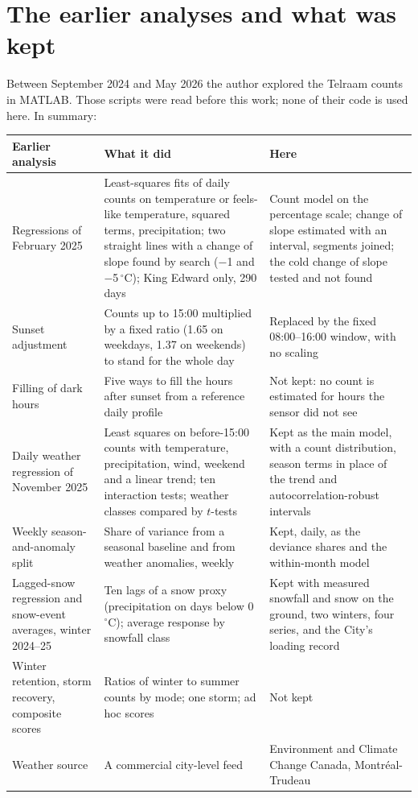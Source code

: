 \documentclass[11pt,a4paper]{article}
\begin{document}
\section{The earlier analyses and what was kept}\label{app:matlab}
Between September 2024 and May 2026 the author explored the Telraam counts in MATLAB. Those scripts were read before this work; none of their code is used here. In summary:
\begin{center}\footnotesize\begin{tabular}{@{}p{3.3cm}p{6.6cm}p{5.6cm}@{}}\toprule
Earlier analysis & What it did & Here\\\midrule
Regressions of February 2025 & Least-squares fits of daily counts on temperature or feels-like temperature, squared terms, precipitation; two straight lines with a change of slope found by search ($-$1 and $-$5\,$^\circ$C); King Edward only, 290 days & Count model on the percentage scale; change of slope estimated with an interval, segments joined; the cold change of slope tested and not found \\
Sunset adjustment & Counts up to 15:00 multiplied by a fixed ratio (1.65 on weekdays, 1.37 on weekends) to stand for the whole day & Replaced by the fixed 08:00--16:00 window, with no scaling \\
Filling of dark hours & Five ways to fill the hours after sunset from a reference daily profile & Not kept: no count is estimated for hours the sensor did not see \\
Daily weather regression of November 2025 & Least squares on before-15:00 counts with temperature, precipitation, wind, weekend and a linear trend; ten interaction tests; weather classes compared by $t$-tests & Kept as the main model, with a count distribution, season terms in place of the trend and autocorrelation-robust intervals \\
Weekly season-and-anomaly split & Share of variance from a seasonal baseline and from weather anomalies, weekly & Kept, daily, as the deviance shares and the within-month model \\
Lagged-snow regression and snow-event averages, winter 2024--25 & Ten lags of a snow proxy (precipitation on days below 0\,$^\circ$C); average response by snowfall class & Kept with measured snowfall and snow on the ground, two winters, four series, and the City\textquoteright{}s loading record \\
Winter retention, storm recovery, composite scores & Ratios of winter to summer counts by mode; one storm; ad hoc scores & Not kept \\
Weather source & A commercial city-level feed & Environment and Climate Change Canada, Montréal-Trudeau \\
\bottomrule\end{tabular}\end{center}
\end{document}
